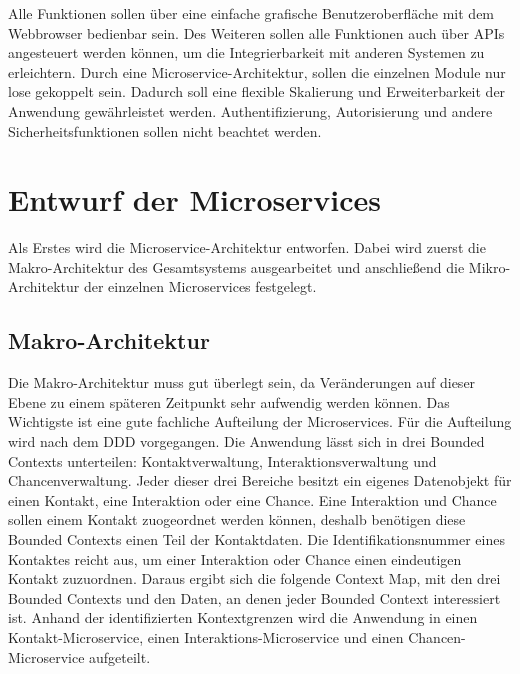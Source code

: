 Alle Funktionen sollen über eine einfache grafische Benutzeroberfläche mit dem Webbrowser bedienbar sein. Des Weiteren sollen alle Funktionen auch über \acp{API} angesteuert werden können, um die Integrierbarkeit mit anderen Systemen zu erleichtern. Durch eine Microservice-Architektur, sollen die einzelnen Module nur lose gekoppelt sein. Dadurch soll eine flexible Skalierung und Erweiterbarkeit der Anwendung gewährleistet werden. Authentifizierung, Autorisierung und andere Sicherheitsfunktionen sollen nicht beachtet werden.

\clearpage
\section{Entwurf der Microservices}

Als Erstes wird die Microservice-Architektur entworfen. Dabei wird zuerst die Makro-Architektur des Gesamtsystems ausgearbeitet und anschließend die Mikro-Architektur der einzelnen Microservices festgelegt.

\subsection{Makro-Architektur}

Die Makro-Architektur muss gut überlegt sein, da Veränderungen auf dieser Ebene zu einem späteren Zeitpunkt sehr aufwendig werden können. Das Wichtigste ist eine gute fachliche Aufteilung der Microservices. Für die Aufteilung wird nach dem \ac{DDD} vorgegangen. Die Anwendung lässt sich in drei Bounded Contexts unterteilen: Kontaktverwaltung, Interaktionsverwaltung und Chancenverwaltung. Jeder dieser drei Bereiche besitzt ein eigenes Datenobjekt für einen Kontakt, eine Interaktion oder eine Chance. Eine Interaktion und Chance sollen einem Kontakt zuogeordnet werden können, deshalb benötigen diese Bounded Contexts einen Teil der Kontaktdaten. Die Identifikationsnummer eines Kontaktes reicht aus, um einer Interaktion oder Chance einen eindeutigen Kontakt zuzuordnen. Daraus ergibt sich die folgende Context Map, mit den drei Bounded Contexts und den Daten, an denen jeder Bounded Context interessiert ist. Anhand der identifizierten Kontextgrenzen wird die Anwendung in einen Kontakt-Microservice, einen Interaktions-Microservice und einen Chancen-Microservice aufgeteilt.

